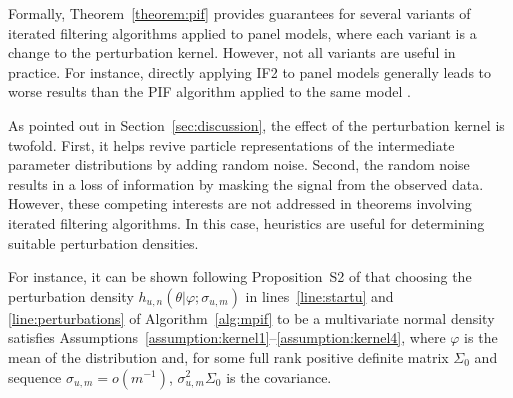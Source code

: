   \noindent Formally, Theorem~\ref{theorem:pif} provides guarantees for several variants of iterated filtering algorithms applied to panel models, where each variant is a change to the perturbation kernel. 
  However, not all variants are useful in practice. 
    For instance, directly applying IF2 to panel models generally leads to worse results than the PIF algorithm applied to the same model \citep{breto20}.
  
  As pointed out in Section~\ref{sec:discussion}, the effect of the perturbation kernel is twofold. 
    First, it helps revive particle representations of the intermediate parameter distributions by adding random noise. 
    Second, the random noise results in a loss of information by masking the signal from the observed data. 
    However, these competing interests are not addressed in theorems involving iterated filtering algorithms.
    In this case, heuristics are useful for determining suitable perturbation densities. 
    
    For instance, it can be shown following Proposition~S2 of \citet{chen24} that choosing the perturbation density $h_{u, n}(\theta|\varphi; \sigma_{u, m})$ in lines~\ref{line:startu} and \ref{line:perturbations} of Algorithm~\ref{alg:mpif} to be a multivariate normal density satisfies Assumptions~\ref{assumption:kernel1}--\ref{assumption:kernel4}, where $\varphi$ is the mean of the distribution and, for some full rank positive definite matrix $\Sigma_0$ and sequence $\sigma_{u, m} = o(m^{-1})$, $\sigma^2_{u, m}\Sigma_0$ is the covariance.
    
